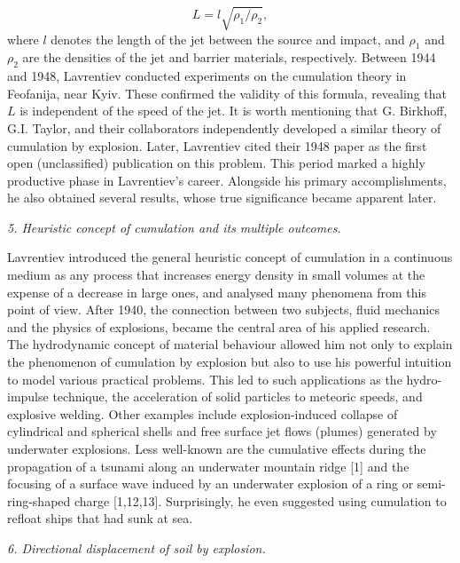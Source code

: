 \documentclass[%
 reprint,
onecolumn,
 amsmath,amssymb, aps,
]{revtex4-2}
\numberwithin{equation}{section}
\begin{document}
 \begin{equation}
    L=l\sqrt{\rho_1/\rho_2},\nonumber
\end{equation}
where $l$ denotes the length of the jet between the source and impact, and $\rho_1$ and $\rho_2$ are the densities of the jet and barrier materials, respectively.
Between 1944 and 1948, Lavrentiev conducted experiments on the cumulation theory in Feofanija, near Kyiv.
These confirmed the validity of this formula, revealing that $L$ is independent of the speed of the jet.
It is worth mentioning that G. Birkhoff, G.I. Taylor, and their collaborators independently developed a similar theory of cumulation by explosion.
Later, Lavrentiev cited their 1948 paper as the first open (unclassified) publication on this problem.
This period marked a highly productive phase in Lavrentiev’s career.
Alongside his primary accomplishments, he also obtained several results, whose true significance became apparent later.
\vspace{3mm}

\textit{5. Heuristic concept of cumulation and its multiple outcomes.}
\vspace{1mm}

Lavrentiev introduced the general heuristic concept of cumulation in a continuous medium as any process that increases energy density in small volumes at the expense of a decrease in large ones, and analysed many phenomena from this point of view.
After 1940, the connection between two subjects, fluid mechanics and the physics of explosions,  became the central area of his applied research.
The hydrodynamic concept of material behaviour allowed him not only to explain the phenomenon of cumulation by explosion but also to use his powerful intuition to model various practical problems.
This led to such applications as the hydro-impulse technique, the acceleration of solid particles to meteoric speeds, and explosive welding.
Other examples include explosion-induced collapse of cylindrical and spherical shells and free surface jet flows (plumes) generated by underwater explosions.
Less well-known are the cumulative effects during the propagation of a tsunami along an underwater mountain ridge [1] and the focusing of a surface wave induced by an underwater explosion of a ring or semi-ring-shaped charge [1,12,13].
Surprisingly, he even suggested using cumulation to refloat ships that had sunk at sea.
\vspace{3mm}

\textit{6. Directional displacement of soil by explosion.}
\vspace{1mm}
\end{document}
